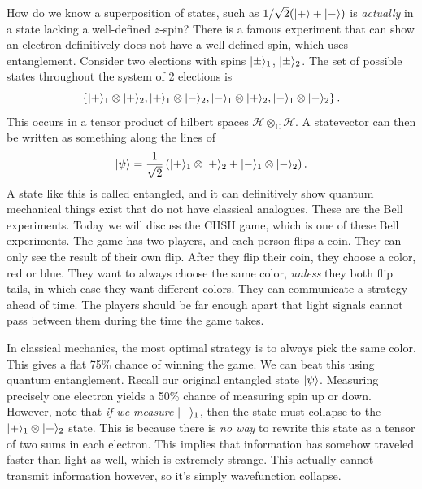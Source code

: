 How do we know a superposition of states, such as $1/\sqrt{2} (\lvert+\rangle +\lvert-\rangle )$ is \emph{actually} in a state lacking a well-defined $z$-spin? There is a famous experiment that can show an electron definitively does not have a well-defined spin, which uses entanglement. Consider two elections with spins $\lvert\pm\rangle_1$, $\lvert\pm\rangle_2$. The set of possible states throughout the system of 2 elections is
\[
	\left\{ \lvert+\rangle_1 \otimes \lvert+\rangle_2,\lvert+\rangle_1 \otimes \lvert-\rangle_2,\lvert-\rangle_1\otimes \lvert+\rangle_2,\lvert-\rangle _1\otimes \lvert-\rangle _2 \right\} 
.\]
This occurs in a tensor product of hilbert spaces $\mathcal{H} \otimes_{\mathbb{C} } \mathcal{H} $. A statevector can then be written as something along the lines of
\[
	\lvert\psi \rangle =\frac{1}{\sqrt{2} } \left( \lvert+\rangle_1 \otimes \lvert+\rangle_2+\lvert-\rangle_1 \otimes \lvert-\rangle_2 \right) 
.\]
A state like this is called entangled, and it can definitively show quantum mechanical things exist that do not have classical analogues. These are the Bell experiments. Today we will discuss the CHSH game, which is one of these Bell experiments. The game has two players, and each person flips a coin. They can only see the result of their own flip. After they flip their coin, they choose a color, red or blue. They want to always choose the same color, \emph{unless} they both flip tails, in which case they want different colors. They can communicate a strategy ahead of time. The players should be far enough apart that light signals cannot pass between them during the time the game takes.

In classical mechanics, the most optimal strategy is to always pick the same color. This gives a flat 75\% chance of winning the game. We can beat this using quantum entanglement. Recall our original entangled state $\lvert\psi \rangle $. Measuring precisely one electron yields a 50\% chance of measuring spin up or down. However, note that \emph{if we measure} $\lvert+\rangle_1$, then the state must collapse to the $\lvert+\rangle_1 \otimes \lvert+\rangle_2$ state. This is because there is \emph{no way} to rewrite this state as a tensor of two sums in each electron. This implies that information has somehow traveled faster than light as well, which is extremely strange. This actually cannot transmit information however, so it's simply wavefunction collapse.

